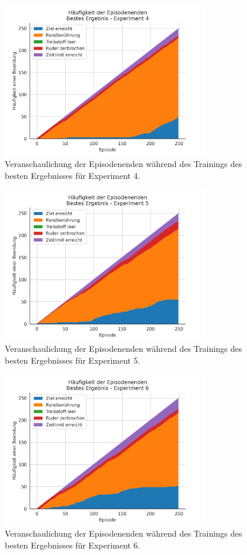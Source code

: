 \documentclass[]{iat}
\begin{document}
\begin{figure}[H]
    \includegraphics[width=0.8\textwidth]{graphics/stacked_best/stacked_plot_bs4.png}
    \centering
    \caption{Veranschaulichung der Episodenenden während des Trainings des besten Ergebnisses für Experiment 4.}
    \label{abb:stacked_plot_bs4}
\end{figure}
\begin{figure}[H]
    \includegraphics[width=0.8\textwidth]{graphics/stacked_best/stacked_plot_bs5.png}
    \centering
    \caption{Veranschaulichung der Episodenenden während des Trainings des besten Ergebnisses für Experiment 5.}
    \label{abb:stacked_plot_bs5}
\end{figure}
\begin{figure}[H]
    \includegraphics[width=0.8\textwidth]{graphics/stacked_best/stacked_plot_bs6.png}
    \centering
    \caption{Veranschaulichung der Episodenenden während des Trainings des besten Ergebnisses für Experiment 6.}
    \label{abb:stacked_plot_bs6}
\end{figure}
\end{document}
